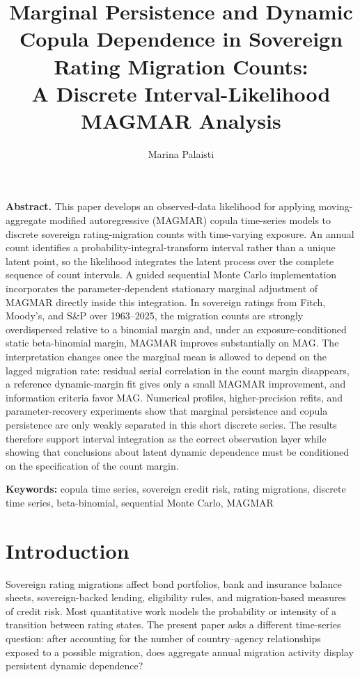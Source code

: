 \documentclass[11pt]{article}
\makeatletter
\theoremstyle{definition}
\newcommand{\@affiliation}{}
\renewcommand{\abstract}[1]{%
    \begin{center}
        \begin{minipage}{0.92\textwidth}
            \small
            \noindent\textbf{Abstract.}\quad #1
        \end{minipage}
    \end{center}
    \vspace{0.8em}
}
\newcommand{\keywords}[1]{%
    \begin{center}
        \begin{minipage}{0.92\textwidth}
            \small
            \noindent\textbf{Keywords:} #1
        \end{minipage}
    \end{center}
    \vspace{1em}
}
\renewcommand{\maketitle}{%
    \begin{center}
        {\LARGE\bfseries \@title\par}
        \vspace{1.2em}
        {\large \@author\par}
        \ifx\@affiliation\@empty\else
        \vspace{0.6em}
        {\small \@affiliation\par}
        \fi
    \end{center}
    \vspace{1.2em}
}
\makeatother
\begin{document}
\title{Marginal Persistence and Dynamic Copula Dependence in Sovereign Rating Migration Counts:\\
A Discrete Interval-Likelihood MAGMAR Analysis}
\author{Marina Palaisti}
\maketitle

\abstract{%
This paper develops an observed-data likelihood for applying moving-aggregate
modified autoregressive (MAGMAR) copula time-series models to discrete sovereign
rating-migration counts with time-varying exposure. An annual count identifies a
probability-integral-transform interval rather than a unique latent point, so the
likelihood integrates the latent process over the complete sequence of count
intervals. A guided sequential Monte Carlo implementation incorporates the
parameter-dependent stationary marginal adjustment of MAGMAR directly inside this
integration. In sovereign ratings from Fitch, Moody's, and S\&P over 1963--2025,
the migration counts are strongly overdispersed relative to a binomial margin and,
under an exposure-conditioned static beta-binomial margin, MAGMAR improves
substantially on MAG. The interpretation changes
once the marginal mean is allowed to depend on the lagged migration rate: residual
serial correlation in the count margin disappears, a reference dynamic-margin fit
gives only a small MAGMAR improvement, and information criteria favor MAG. Numerical
profiles, higher-precision refits, and parameter-recovery experiments show that
marginal persistence and copula persistence are only weakly separated in this short
discrete series. The results therefore support interval integration as the correct
observation layer while showing that conclusions about latent dynamic dependence
must be conditioned on the specification of the count margin.}

\keywords{copula time series, sovereign credit risk, rating migrations,
discrete time series, beta-binomial, sequential Monte Carlo, MAGMAR}

\section{Introduction}
\label{sec:intro}

Sovereign rating migrations affect bond portfolios, bank and insurance balance
sheets, sovereign-backed lending, eligibility rules, and migration-based measures
of credit risk. Most quantitative work models the probability or intensity of a
transition between rating states. The present paper asks a different time-series
question: after accounting for the number of country--agency relationships exposed
to a possible migration, does aggregate annual migration activity display persistent
dynamic dependence?
\end{document}
